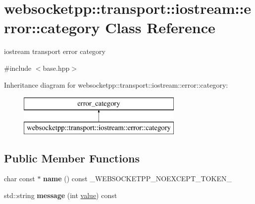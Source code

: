 \hypertarget{classwebsocketpp_1_1transport_1_1iostream_1_1error_1_1category}{}\section{websocketpp\+:\+:transport\+:\+:iostream\+:\+:error\+:\+:category Class Reference}
\label{classwebsocketpp_1_1transport_1_1iostream_1_1error_1_1category}


iostream transport error category  




{\ttfamily \#include $<$base.\+hpp$>$}

Inheritance diagram for websocketpp\+:\+:transport\+:\+:iostream\+:\+:error\+:\+:category\+:\begin{figure}[H]
\begin{center}
\leavevmode
\includegraphics[height=2.000000cm]{classwebsocketpp_1_1transport_1_1iostream_1_1error_1_1category}
\end{center}
\end{figure}
\subsection*{Public Member Functions}
\begin{DoxyCompactItemize}
\item 
char const  $\ast$ {\bfseries name} () const \+\_\+\+W\+E\+B\+S\+O\+C\+K\+E\+T\+P\+P\+\_\+\+N\+O\+E\+X\+C\+E\+P\+T\+\_\+\+T\+O\+K\+E\+N\+\_\+\hypertarget{classwebsocketpp_1_1transport_1_1iostream_1_1error_1_1category_a64f1fd16853587d751680244b8d105c6}{}\label{classwebsocketpp_1_1transport_1_1iostream_1_1error_1_1category_a64f1fd16853587d751680244b8d105c6}

\item 
std\+::string {\bfseries message} (int \hyperlink{namespacewebsocketpp_1_1transport_1_1iostream_1_1error_a647b428e260748d7606c92255e1e9737}{value}) const\hypertarget{classwebsocketpp_1_1transport_1_1iostream_1_1error_1_1category_a8e072eecb96dd743e84b4d1c9e5dbab1}{}\label{classwebsocketpp_1_1transport_1_1iostream_1_1error_1_1category_a8e072eecb96dd743e84b4d1c9e5dbab1}

\end{DoxyCompactItemize}


